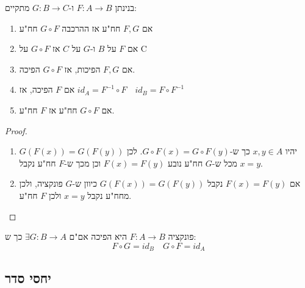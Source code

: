 \documentclass{tstextbook}
\begin{document}
\begin{proposition}
בנינתן \(F:A\to B\) ו-\(G:B\to C\) מתקיים:

  \begin{enumerate}
    \item אם \(F,G\) חח"ע אז ההרכבה \(G\circ F\) חח"ע 


    \item אם \(F\) על \(B\) ו-\(G\) על \(C\) אז \(G\circ F\) על C 


    \item אם \(F,G\) הפיכות, אז \(G\circ F\) הפיכה. 


    \item אם \(F\) הפיכה, אז \(id_{A}=F^{-1}\circ F\quad id_{B}=F\circ F^{-1}\)


    \item אם \(G \circ F\) חח"ע אז \(F\) חח"ע. 


  \end{enumerate}
\end{proposition}
\begin{proof}
  \begin{enumerate}
    \item יהיו \(x,y \in A\) כך ש-\(G \circ F(x)=G \circ F(y)\). לכן \(G(F(x))=G(F(y))\) מכל ש-\(G\) חח"ע נובע \(F(x)=F(y)\) וכן מכך ש-\(F\) חח"ע נקבל \(x=y\). 


    \item אם \(F(x)=F(y)\) נקבל \(G(F(x))=G(F(y))\) כיוון ש-\(G\) פונקציה, ולכן מחח"ע נקבל \(x=y\) ולכן \(F\) חח"ע. 


  \end{enumerate}
\end{proof}
\begin{proposition}
פונקציה \(F:A\to B\) היא הפיכה אם"ם \(\exists G:B\to A\) כך ש:
$$F\circ G = id_{B}\quad G\circ  F = id_{A}$$

\end{proposition}
\subsection{יחסי סדר}
\end{document}
